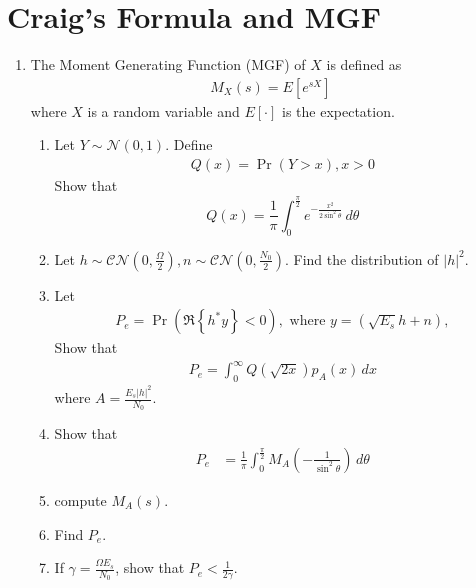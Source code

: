 \documentclass[journal,10pt,twocolumn]{IEEEtran}
\providecommand{\pr}[1]{\ensuremath{\Pr\left(#1\right)}}
\providecommand{\qfunc}[1]{\ensuremath{Q\left(#1\right)}}
\providecommand{\sbrak}[1]{\ensuremath{{}\left[#1\right]}}
\providecommand{\brak}[1]{\ensuremath{\left(#1\right)}}
\providecommand{\cbrak}[1]{\ensuremath{\left\{#1\right\}}}
\providecommand{\abs}[1]{\left\vert#1\right\vert}
\providecommand{\gauss}[2]{\mathcal{N}\ensuremath{\left(#1,#2\right)}}
\begin{document}
\section{Craig's Formula and MGF}
\begin{enumerate}
\item
The Moment Generating Function (MGF) of $X$ is defined as
%
\begin{align}
M_{X}(s) = E\sbrak{e^{s X}}
\end{align}
%
where $X$ is a random variable and $E\sbrak{\cdot}$ is the expectation.  
%
%
\begin{enumerate}[label=(\alph{enumii})]
\item Let $Y \sim \gauss{0}{1}$.  Define
%
\begin{align}
Q(x) = \pr{Y > x}, x > 0
\end{align}
%
Show that
\begin{equation}
Q(x) = \frac{1}{\pi}\int^{\frac{\pi}{2}}_{0}e^{-\frac{x^2}{2\sin^2 \theta}}\,d\theta
\end{equation}
\item 
Let $h\sim\mathcal{CN}\brak{0,\frac{\Omega}{2}},n\sim\mathcal{CN}\brak{0,\frac{N_0}{2}}$.  Find the distribution of $\abs{h}^2$.
\item Let
%
\begin{align}
P_e = \pr{\Re \cbrak{h^*y} < 0}, \text{ where } y = \brak{\sqrt{E_s}h + n},
\end{align}
%
Show that
%
\begin{align}
P_e = \int_{0}^{\infty}\qfunc{\sqrt{2x}}p_{A}(x) \,dx
\end{align}
where $A = \frac{E_s\abs{h}^2}{N_0}$.
\item Show that
%
\begin{align}
P_e 
&=  \frac{1}{\pi}\int_{0}^{\frac{\pi}{2}}M_{A}\brak{-\frac{1}{\sin^2\theta}}\,d\theta
\label{ch4_pe_mgf}
\end{align}
%
\item compute $M_A(s)$.
%
\item 
Find $P_e$.
\item 
If $\gamma = \frac{\Omega E_s}{N_0}$, show that $P_e < \frac{1}{2\gamma}$. 
\end{enumerate}
\end{enumerate}
%
\end{document}
